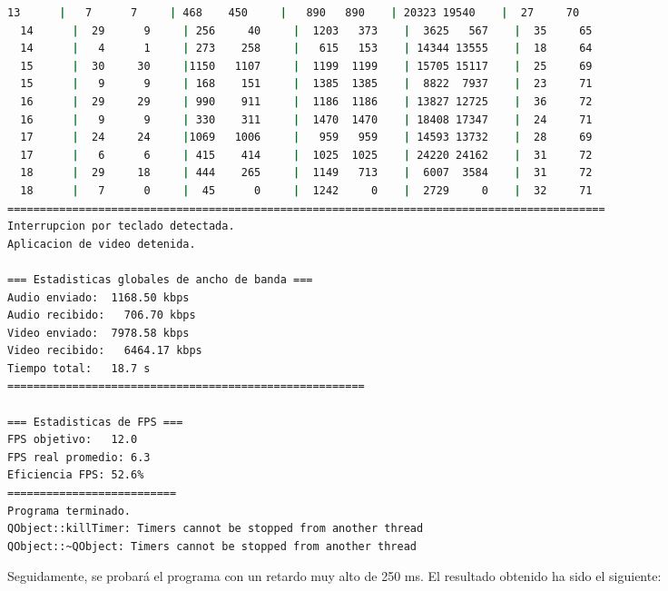 \begin{adjustbox}{max width=\textwidth}
\begin{lstlisting}[language=bash,basicstyle=\ttfamily\scriptsize]
  13      |   7      7     | 468    450     |   890   890    | 20323 19540    |  27     70
  14      |  29      9     | 256     40     |  1203   373    |  3625   567    |  35     65
  14      |   4      1     | 273    258     |   615   153    | 14344 13555    |  18     64
  15      |  30     30     |1150   1107     |  1199  1199    | 15705 15117    |  25     69
  15      |   9      9     | 168    151     |  1385  1385    |  8822  7937    |  23     71
  16      |  29     29     | 990    911     |  1186  1186    | 13827 12725    |  36     72
  16      |   9      9     | 330    311     |  1470  1470    | 18408 17347    |  24     71
  17      |  24     24     |1069   1006     |   959   959    | 14593 13732    |  28     69
  17      |   6      6     | 415    414     |  1025  1025    | 24220 24162    |  31     72
  18      |  29     18     | 444    265     |  1149   713    |  6007  3584    |  31     72
  18      |   7      0     |  45      0     |  1242     0    |  2729     0    |  32     71
============================================================================================
Interrupcion por teclado detectada.
Aplicacion de video detenida.

=== Estadisticas globales de ancho de banda ===
Audio enviado:	1168.50 kbps
Audio recibido:   706.70 kbps
Video enviado:	7978.58 kbps
Video recibido:   6464.17 kbps
Tiempo total: 	18.7 s
=======================================================

=== Estadisticas de FPS ===
FPS objetivo: 	12.0
FPS real promedio: 6.3
Eficiencia FPS:	52.6%
==========================
Programa terminado.
QObject::killTimer: Timers cannot be stopped from another thread
QObject::~QObject: Timers cannot be stopped from another thread
\end{lstlisting}
\end{adjustbox}
\vspace{\baselineskip}

\newpage

Seguidamente, se probará el programa con un retardo muy alto de 250 ms. El resultado obtenido ha sido el siguiente:
\vspace{\baselineskip}

